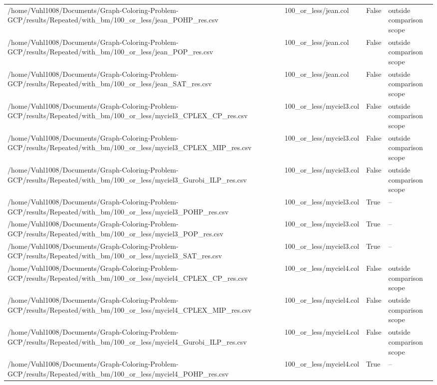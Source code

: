 \begin{table}[htbp]
\begin{tabular}{llll}
/home/Vuhl1008/Documents/Graph-Coloring-Problem-GCP/results/Repeated/with\_bm/100\_or\_less/jean\_POHP\_res.csv & 100\_or\_less/jean.col & False & outside comparison scope \\
/home/Vuhl1008/Documents/Graph-Coloring-Problem-GCP/results/Repeated/with\_bm/100\_or\_less/jean\_POP\_res.csv & 100\_or\_less/jean.col & False & outside comparison scope \\
/home/Vuhl1008/Documents/Graph-Coloring-Problem-GCP/results/Repeated/with\_bm/100\_or\_less/jean\_SAT\_res.csv & 100\_or\_less/jean.col & False & outside comparison scope \\
/home/Vuhl1008/Documents/Graph-Coloring-Problem-GCP/results/Repeated/with\_bm/100\_or\_less/myciel3\_CPLEX\_CP\_res.csv & 100\_or\_less/myciel3.col & False & outside comparison scope \\
/home/Vuhl1008/Documents/Graph-Coloring-Problem-GCP/results/Repeated/with\_bm/100\_or\_less/myciel3\_CPLEX\_MIP\_res.csv & 100\_or\_less/myciel3.col & False & outside comparison scope \\
/home/Vuhl1008/Documents/Graph-Coloring-Problem-GCP/results/Repeated/with\_bm/100\_or\_less/myciel3\_Gurobi\_ILP\_res.csv & 100\_or\_less/myciel3.col & False & outside comparison scope \\
/home/Vuhl1008/Documents/Graph-Coloring-Problem-GCP/results/Repeated/with\_bm/100\_or\_less/myciel3\_POHP\_res.csv & 100\_or\_less/myciel3.col & True & -- \\
/home/Vuhl1008/Documents/Graph-Coloring-Problem-GCP/results/Repeated/with\_bm/100\_or\_less/myciel3\_POP\_res.csv & 100\_or\_less/myciel3.col & True & -- \\
/home/Vuhl1008/Documents/Graph-Coloring-Problem-GCP/results/Repeated/with\_bm/100\_or\_less/myciel3\_SAT\_res.csv & 100\_or\_less/myciel3.col & True & -- \\
/home/Vuhl1008/Documents/Graph-Coloring-Problem-GCP/results/Repeated/with\_bm/100\_or\_less/myciel4\_CPLEX\_CP\_res.csv & 100\_or\_less/myciel4.col & False & outside comparison scope \\
/home/Vuhl1008/Documents/Graph-Coloring-Problem-GCP/results/Repeated/with\_bm/100\_or\_less/myciel4\_CPLEX\_MIP\_res.csv & 100\_or\_less/myciel4.col & False & outside comparison scope \\
/home/Vuhl1008/Documents/Graph-Coloring-Problem-GCP/results/Repeated/with\_bm/100\_or\_less/myciel4\_Gurobi\_ILP\_res.csv & 100\_or\_less/myciel4.col & False & outside comparison scope \\
/home/Vuhl1008/Documents/Graph-Coloring-Problem-GCP/results/Repeated/with\_bm/100\_or\_less/myciel4\_POHP\_res.csv & 100\_or\_less/myciel4.col & True & -- \\

\end{tabular}
\end{table}
